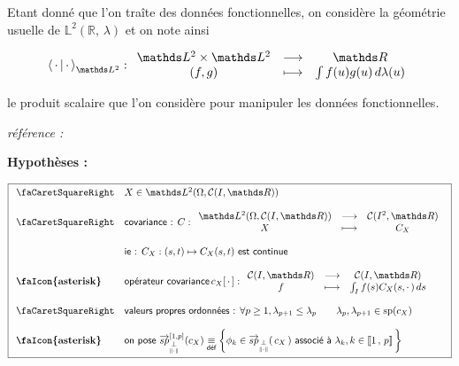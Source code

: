\bigskip

Etant donné que l'on traîte des données fonctionnelles, on considère la géométrie usuelle de $\mathds L^2(\mathds R, \, \lambda)$ et on note ainsi 

$$\prodscalselon \cdot \cdot {\mathds L^2}: \begin{array}{ccc}
    \mathds L^2 \times \mathds L^2 & \longrightarrow & \mathds R
    \\
    (f,g) & \longmapsto & \int f(u)g(u) \, d\lambda(u) 
\end{array}$$ 

le produit scalaire que l'on considère pour manipuler les données fonctionnelles.

\begin{minipage}{\textwidth}
\begin{thm}
    \emph{référence :} ~\cite[pages : 238-239-241]{kokoszka2017introduction}

    \textbf{Hypothèses :}

    $$
    \boxed{
    \begin{array}{ll}
        \textsf{\faCaretSquareRight} & X \in \mathds L^2( \Omega, \mathcal C(I, \mathds R)) 
        \\ \\
        \textsf{\faCaretSquareRight} & \textsf{covariance : } C : \begin{array}{ccc}
            \mathds L^2( \Omega, \mathcal C(I, \mathds R)) & \longrightarrow & \mathcal C(I^2, \mathds R)
            \\
            X & \longmapsto & C_X
        \end{array}
        \\ \\
        & \textsf{ie : } C_X : (s, t) \mapsto C_X(s,t) \textsf{ est continue}
        \\ \\
        \textbf{\faIcon{asterisk}} & \textsf{opérateur covariance} \, c_X[ \, \cdot \, ] : \begin{array}{ccc}
            \mathcal C(I, \mathds R) & \longrightarrow & \mathcal C(I, \mathds R)
            \\
            f & \longmapsto & \int_I f(s) C_X(s, \cdot \, ) \, ds \end{array}
        \\\\
        \textsf{\faCaretSquareRight} & \textsf{valeurs propres ordonnées : } \forall p \geq 1, \lambda_{p+1} \leq \lambda_p \quad\quad \lambda_p, \lambda_{p+1} \in \operatorname{sp}(c_X)
        \\ \\
        \textbf{\faIcon{asterisk}} & \textsf{on pose } \overrightarrow{sp}_{\orthonormal}^{[1,p]}(c_X) \isdef \left\{ \phi_k \in \overrightarrow{sp}_{\orthonormal}( \, c_X \, ) \textsf{ associé à }  \lambda_k, k \in \intervaleint 1 p \, \right\}
    \end{array} 
    }
    $$


\end{thm}
\end{minipage}
